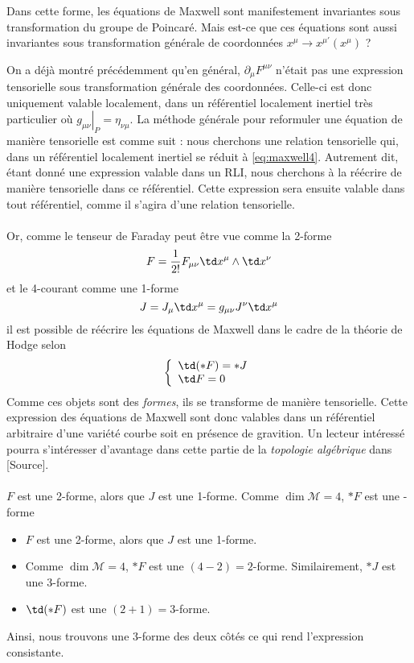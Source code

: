 Dans cette forme, les équations de Maxwell sont manifestement invariantes sous transformation du groupe de Poincaré. Mais est-ce que ces équations sont aussi invariantes sous transformation générale de coordonnées $x^{\mu} \to x^{\mu '}(x^{\mu})$ ?

On a déjà montré précédemment qu'en général, $\partial_{\mu}F^{\mu \nu}$ n'était pas une expression tensorielle sous transformation générale des coordonnées. Celle-ci est donc uniquement valable localement, dans un référentiel localement inertiel très particulier où $\left. g_{\mu \nu}\right|_P = \eta_{\nu \mu}$. La méthode générale pour reformuler une équation de manière tensorielle est comme suit : nous cherchons une relation tensorielle qui, dans un référentiel localement inertiel se réduit à \ref{eq:maxwell4}. Autrement dit, étant donné une expression valable dans un RLI, nous cherchons à la réécrire de manière tensorielle dans ce référentiel. Cette expression sera ensuite valable dans tout référentiel, comme il s'agira d'une relation tensorielle.\\
\\
Or, comme le tenseur de Faraday peut être vue comme la 2-forme
\begin{equation}
    F = \frac{1}{2!} F_{\mu\nu} \td x^\mu \wedge \td x^\nu
\end{equation}
et le 4-courant comme une 1-forme
\begin{equation}
    J = J_\mu \td x^\mu = g_{\mu\nu} J^\nu \td x^\mu
\end{equation}
il est possible de réécrire les équations de Maxwell dans le cadre de la théorie de Hodge selon
\begin{align}
\label{eq:Maxwell formes}
    \left\{
\begin{array}{l}
\td (*F) = *J\\
\td F = 0
\end{array}
\right.
\end{align}
Comme ces objets sont des \emph{formes}, ils se transforme de manière tensorielle. Cette expression des équations de Maxwell sont donc valables dans un référentiel arbitraire d'une variété courbe soit en présence de gravition. Un lecteur intéressé pourra s'intéresser d'avantage dans cette partie de la \emph{topologie algébrique} dans [Source].\\
\\
$F$ est une 2-forme, alors que $J$ est une 1-forme. Comme $\dim \mathcal{M} = 4$, $*F$ est une -forme
\begin{itemize}
    \item $F$ est une 2-forme, alors que $J$ est une 1-forme.
    \item Comme $\dim \mathcal{M} = 4$, $*F$ est une $(4-2) = 2$-forme. Similairement, $*J$ est une 3-forme.
    \item $\td (*F)$ est une $(2+1) = 3$-forme.
\end{itemize}
Ainsi, nous trouvons une 3-forme des deux côtés ce qui rend l'expression consistante.

